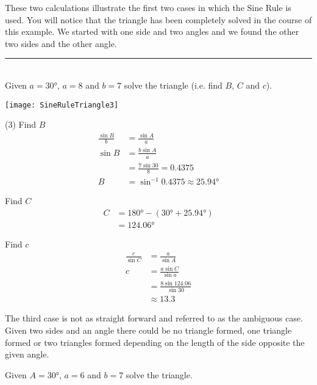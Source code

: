 These two calculations illustrate the first two cases in which the Sine Rule is used. You will notice that the triangle has been completely solved in the course of this example. We started with one side and two angles and we found the other two sides and the other angle. \\
\rule{6.8cm}{0.5pt}\\
\example Given $a =\ang{30} $, $a =8$ and $b =7$ solve the triangle (i.e. find $B$, $C$ and $c$). \\
\begin{center}
	\texttt{[image: SineRuleTriangle3]}\\
\end{center}
\solution
\begin{tasks}(3)
\task Find $B$
\begin{align*}\frac{\sin  B}{b} &  = \frac{\sin  A}{a} \\
\sin  B &  = \frac{b \sin  A}{a} \\
&  = \frac{7 \sin  30 }{8} =0.4375 \\
B &  = \sin ^{ -1} 0.4375 \approx \ang{25.94} \end{align*}

\task Find $C$
\begin{align*}C &  = \ang{180}  -(\ang{30}  +\ang{25.94} ) \\
&  = \ang{124.06} \end{align*}

\task Find $c$
\begin{align*}\frac{c}{\sin  C} &  = \frac{a}{\sin  A} \\
c &  = \frac{a \sin  C}{\sin a} \\
&  = \frac{8 \sin  124.06 }{\sin  30 } \\
&  \approx   13.3\end{align*}
\end{tasks}
The third case is not as straight forward and referred to as the ambiguous case. Given two sides and an angle there could be no triangle formed, one triangle formed or two triangles formed depending on the length of the side opposite the given angle.

 Given $A =\ang{30} $, $a =6$ and $b =7$ solve the triangle. \\

